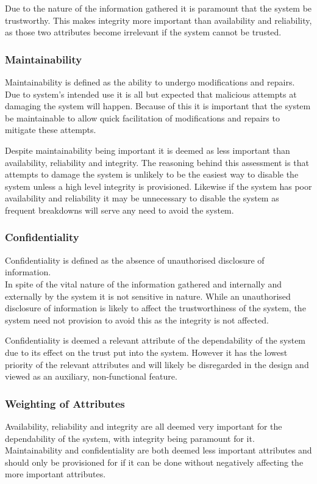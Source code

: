 Due to the nature of the information gathered it is paramount that the system be trustworthy.
This makes integrity more important than availability and reliability, as those two attributes become irrelevant if the system cannot be trusted.

\subsubsection{Maintainability}
Maintainability is defined as the ability to undergo modifications and repairs.\\
Due to system's intended use it is all but expected that malicious attempts at damaging the system will happen.
Because of this it is important that the system be maintainable to allow quick facilitation of modifications and repairs to mitigate these attempts.

Despite maintainability being important it is deemed as less important than availability, reliability and integrity.
The reasoning behind this assessment is that attempts to damage the system is unlikely to be the easiest way to disable the system unless a high level integrity is provisioned.
Likewise if the system has poor availability and reliability it may be unnecessary to disable the system as frequent breakdowns will serve any need to avoid the system.

\subsubsection{Confidentiality}
Confidentiality is defined as the absence of unauthorised disclosure of information.\\
In spite of the vital nature of the information gathered and internally and externally by the system it is not sensitive in nature.
While an unauthorised disclosure of information is likely to affect the trustworthiness of the system, 
the system need not provision to avoid this as the integrity is not affected.

Confidentiality is deemed a relevant attribute of the dependability of the system due to its effect on the trust put into the system.
However it has the lowest priority of the relevant attributes and will likely be disregarded in the design and viewed as an auxiliary, non-functional feature.

\subsubsection{Weighting of Attributes}
Availability, reliability and integrity are all deemed very important for the dependability of the system, with integrity being paramount for it.
Maintainability and confidentiality are both deemed less important attributes and should only be provisioned for if it can be done without negatively affecting the more important attributes.

